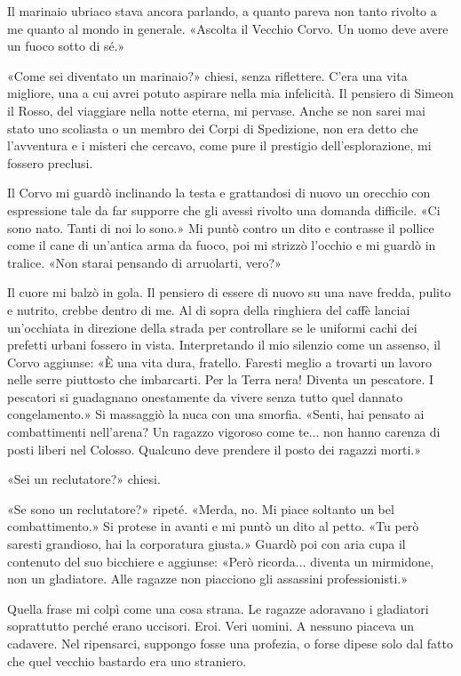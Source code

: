 Il marinaio ubriaco stava ancora parlando, a quanto pareva non tanto
rivolto a me quanto al mondo in generale. «Ascolta il Vecchio Corvo. Un
uomo deve avere un fuoco sotto di sé.»

«Come sei diventato un marinaio?» chiesi, senza riflettere. C'era una
vita migliore, una a cui avrei potuto aspirare nella mia infelicità. Il
pensiero di Simeon il Rosso, del viaggiare nella notte eterna, mi
pervase. Anche se non sarei mai stato uno scoliasta o un membro dei
Corpi di Spedizione, non era detto che l'avventura e i misteri che
cercavo, come pure il prestigio dell'esplorazione, mi fossero preclusi.

Il Corvo mi guardò inclinando la testa e grattandosi di nuovo un
orecchio con espressione tale da far supporre che gli avessi rivolto una
domanda difficile. «Ci sono nato. Tanti di noi lo sono.» Mi puntò contro
un dito e contrasse il pollice come il cane di un'antica arma da fuoco,
poi mi strizzò l'occhio e mi guardò in tralice. «Non starai pensando di
arruolarti, vero?»

Il cuore mi balzò in gola. Il pensiero di essere di nuovo su una nave
fredda, pulito e nutrito, crebbe dentro di me. Al di sopra della
ringhiera del caffè lanciai un'occhiata in direzione della strada per
controllare se le uniformi cachi dei prefetti urbani fossero in vista.
Interpretando il mio silenzio come un assenso, il Corvo aggiunse: «È una
vita dura, fratello. Faresti meglio a trovarti un lavoro nelle serre
piuttosto che imbarcarti. Per la Terra nera! Diventa un pescatore. I
pescatori si guadagnano onestamente da vivere senza tutto quel dannato
congelamento.» Si massaggiò la nuca con una smorfia. «Senti, hai pensato
ai combattimenti nell'arena? Un ragazzo vigoroso come te... non hanno
carenza di posti liberi nel Colosso. Qualcuno deve prendere il posto dei
ragazzi morti.»

«Sei un reclutatore?» chiesi.

«Se sono un reclutatore?» ripeté. «Merda, no. Mi piace soltanto un bel
combattimento.» Si protese in avanti e mi puntò un dito al petto. «Tu
però saresti grandioso, hai la corporatura giusta.» Guardò poi con aria
cupa il contenuto del suo bicchiere e aggiunse: «Però ricorda... diventa
un mirmidone, non un gladiatore. Alle ragazze non piacciono gli
assassini professionisti.»

Quella frase mi colpì come una cosa strana. Le ragazze adoravano i
gladiatori soprattutto perché erano uccisori. Eroi. Veri uomini. A
nessuno piaceva un cadavere. Nel ripensarci, suppongo fosse una
profezia, o forse dipese solo dal fatto che quel vecchio bastardo era
uno straniero.

